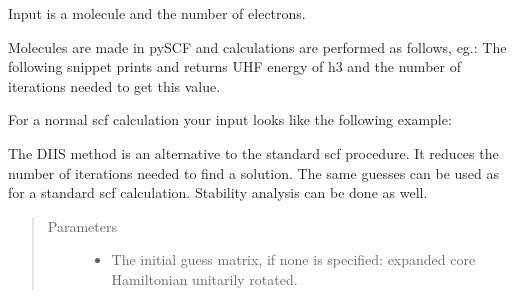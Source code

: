 \documentclass[letterpaper,10pt,english]{sphinxmanual}
\begin{document}
\begin{fulllineitems}
\label{\detokenize{Complex_GHF:ghf.complex_GHF.ComplexGHF}}
Input is a molecule and the number of electrons.

Molecules are made in pySCF and calculations are performed as follows, eg.:
The following snippet prints and returns UHF energy of h3
and the number of iterations needed to get this value.

For a normal scf calculation your input looks like the following example:

\begin{sphinxVerbatim}[commandchars=\\\{\}]
          
   
\end{sphinxVerbatim}

\begin{fulllineitems}
\label{\detokenize{Complex_GHF:ghf.complex_GHF.ComplexGHF.diis}}
The DIIS method is an alternative to the standard scf procedure. It reduces the number of iterations needed to
find a solution. The same guesses can be used as for a standard scf calculation. Stability analysis can be
done as well.
\begin{quote}\begin{description}
\item[{Parameters}] \leavevmode\begin{itemize}
\item {} 
 \textendash{} The initial guess matrix, if none is specified: expanded core Hamiltonian unitarily rotated.


\end{itemize}
\end{description}
\end{quote}
\end{fulllineitems}
\end{fulllineitems}
\end{document}
